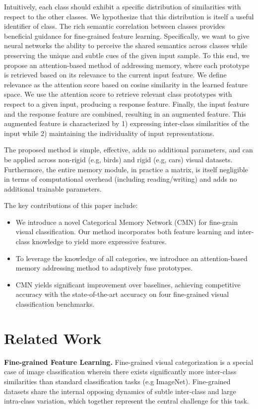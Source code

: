 \documentclass[journal]{IEEEtran}
\begin{document}
Intuitively, each class should exhibit a specific distribution of similarities with respect to the other classes. We hypothesize that this distribution is itself a useful identifier of class.
The rich semantic correlation between classes provides beneficial guidance for fine-grained feature learning. Specifically, we want to give neural networks the ability to perceive the shared semantics across classes while preserving the unique and subtle cues of the given input sample. To this end, we propose an attention-based method of addressing memory, where each prototype is retrieved based on its relevance to the current input feature. We define relevance as the attention score based on cosine similarity in the learned feature space. We use the attention score to retrieve relevant class prototypes with respect to a given input, producing a response feature. Finally, the input feature and the response feature are combined, resulting in an augmented feature. This augmented feature is characterized by 1) expressing inter-class similarities of the input while 2) maintaining the individuality of input representations. 

The proposed method is simple, effective, adds no additional parameters, and can be applied across non-rigid (e.g, birds) and rigid (e.g, cars) visual datasets. Furthermore, the entire memory module, in practice a matrix, is itself negligible in terms of computational overhead (including reading/writing) and adds no additional trainable parameters.

The key contributions of this paper include:
\begin{itemize}
\item We introduce a novel Categorical Memory Network (CMN) for fine-grain visual classification. Our method incorporates both feature learning and inter-class knowledge to yield more expressive features. 
\item To leverage the knowledge of all categories, we introduce an attention-based memory addressing method to adaptively fuse prototypes.
\item CMN yields significant improvement over baselines, achieving competitive accuracy with the state-of-the-art accuracy on four fine-grained visual classification benchmarks.

\end{itemize} 

\section{Related Work}
\textbf{Fine-grained Feature Learning.} Fine-grained visual categorization is a special case of image classification wherein there exists significantly more inter-class similarities than standard classification tasks (e.g ImageNet). Fine-grained datasets share the internal opposing dynamics of subtle inter-class and large intra-class variation, which together represent the central challenge for this task. 
\end{document}
